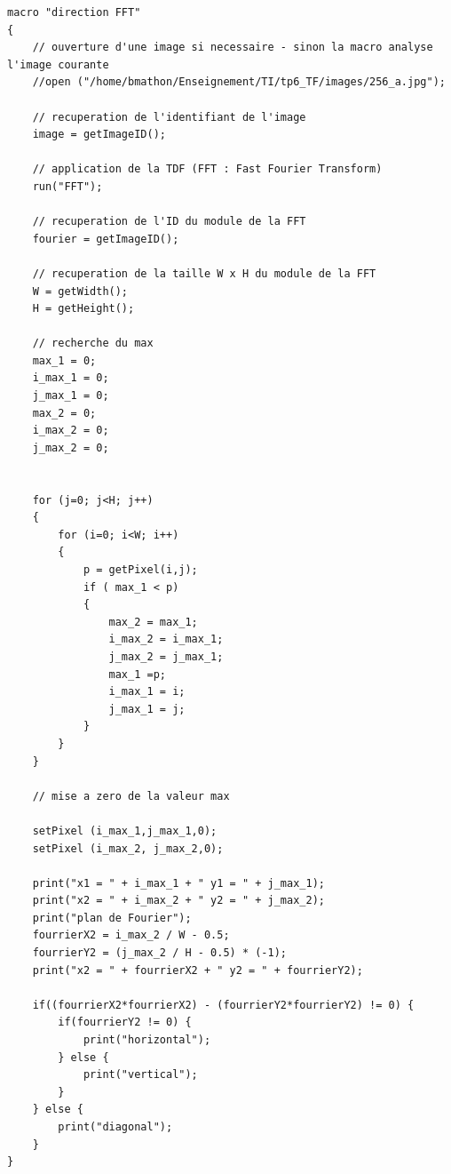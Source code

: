 \documentclass[a4paper,11pt]{article}
\begin{document}
  \begin{lstlisting}[caption=Macro complète du TP]
  macro "direction FFT"
{
    // ouverture d'une image si necessaire - sinon la macro analyse l'image courante
    //open ("/home/bmathon/Enseignement/TI/tp6_TF/images/256_a.jpg");

    // recuperation de l'identifiant de l'image
    image = getImageID();

    // application de la TDF (FFT : Fast Fourier Transform)
    run("FFT");

    // recuperation de l'ID du module de la FFT
    fourier = getImageID();

    // recuperation de la taille W x H du module de la FFT
    W = getWidth();
    H = getHeight();

    // recherche du max
    max_1 = 0; 
    i_max_1 = 0;
    j_max_1 = 0;
    max_2 = 0; 
    i_max_2 = 0;
    j_max_2 = 0;

    
    for (j=0; j<H; j++)
    {
        for (i=0; i<W; i++) 
        {
            p = getPixel(i,j);
            if ( max_1 < p)
            {
                max_2 = max_1;
                i_max_2 = i_max_1;
                j_max_2 = j_max_1;
                max_1 =p;
                i_max_1 = i;
                j_max_1 = j;
            } 
        }
    }

    // mise a zero de la valeur max

    setPixel (i_max_1,j_max_1,0);
    setPixel (i_max_2, j_max_2,0);

    print("x1 = " + i_max_1 + " y1 = " + j_max_1);
    print("x2 = " + i_max_2 + " y2 = " + j_max_2);
    print("plan de Fourier");
    fourrierX2 = i_max_2 / W - 0.5;
    fourrierY2 = (j_max_2 / H - 0.5) * (-1);
    print("x2 = " + fourrierX2 + " y2 = " + fourrierY2);

    if((fourrierX2*fourrierX2) - (fourrierY2*fourrierY2) != 0) {
        if(fourrierY2 != 0) {
            print("horizontal");
        } else {
            print("vertical");
        }
    } else {
        print("diagonal");
    }
}

  \end{lstlisting}
  
\end{document}
